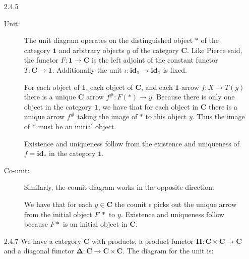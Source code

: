 \documentclass{article}
\newcommand{\one}{\mathbf{1}}
\newcommand{\ccat}{\mathbf{C}}
\newcommand{\id}{\mathbf{id}}
\newcommand{\pifun}{\mathbf{\Pi}}
\newcommand{\diagfun}{\mathbf{\Delta}}
\begin{document}
\begin{enumerate}
\item [2.4.5]
  \begin{description}
  \item [Unit:]
    The unit diagram operates on the distinguished object $*$ of the category $\one$ and arbitrary objects $y$ of the category $\ccat$.
    Like Pierce said, the functor $F : \one \rightarrow \ccat$ is the left adjoint of the constant functor $T : \ccat \rightarrow \one$.
    Additionally the unit $\iota : \id_\one \rightarrow \id_\one$ is fixed.
    \begin{center}
    \end{center}
    For each object of $\one$, each object of $\ccat$, and each $\one$-arrow $f: X \rightarrow T(y)$ there is a unique $\ccat$ arrow $f^{\#} : F(*) \rightarrow y$.
    Because there is only one object in the category $\one$, we have that for each object in $\ccat$ there is a unique arrow $f^{\#}$ taking the image of $*$ to this object $y$.
    Thus the image of $*$ must be an initial object.

    Existence and uniqueness follow from the existence and uniqueness of $f = \id_*$ in the category $\one$.

  \vfill{}
  \item [Co-unit:]
    Similarly, the counit diagram works in the opposite direction.
    \begin{center}
    \end{center}
    We have that for each $y \in \ccat$ the counit $\epsilon$ picks out the unique arrow from the initial object $F~*$ to $y$.
    Existence and uniqueness follow because $F*$ is an initial object in $\ccat$.
  \end{description}
  \vfill{}
\newpage
\item[2.4.7]
  We have a category $\ccat$ with products, a product functor $\pifun : \ccat \times \ccat \rightarrow \ccat$ and a diagonal functor $\diagfun :\ccat \rightarrow \ccat \times \ccat$.
  The diagram for the unit is:
  \begin{center}
\end{center}
\end{enumerate}
\end{document}
